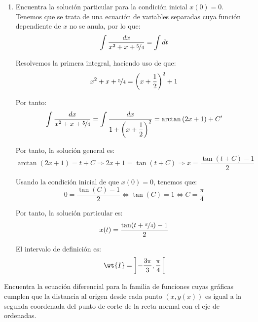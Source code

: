 \documentclass[12pt]{article}
\begin{document}
\begin{ejercicio}
\begin{enumerate}
        \item Encuentra la solución particular para la condición inicial $x(0)=0$.\\
        
        Tenemos que se trata de una ecuación de variables separadas cuya función dependiente de $x$ no se anula, por lo que:
        \begin{equation*}
            \int \dfrac{dx}{x^2+x+\nicefrac{5}{4}}=\int dt
        \end{equation*}

        Resolvemos la primera integral, haciendo uso de que:
        \begin{equation*}
            x^2+x+\nicefrac{5}{4}=\left(x+\dfrac{1}{2}\right)^2+1
        \end{equation*}

        Por tanto:
        \begin{equation*}
            \int \dfrac{dx}{x^2+x+\nicefrac{5}{4}}=\int \dfrac{dx}{1+\left(x+\dfrac{1}{2}\right)^2}=\arctan\left(2x+1\right)+C'
        \end{equation*}

        Por tanto, la solución general es:
        \begin{equation*}
            \arctan\left(2x+1\right)=t+C
            \Longrightarrow 2x+1=\tan(t+C)
            \Longrightarrow x=\dfrac{\tan(t+C)-1}{2}
        \end{equation*}

        Usando la condición inicial de que $x(0)=0$, tenemos que:
        \begin{equation*}
            0=\dfrac{\tan(C)-1}{2}\Longleftrightarrow \tan(C)=1\Longleftrightarrow C=\dfrac{\pi}{4}
        \end{equation*}

        Por tanto, la solución particular es:
        \begin{equation*}
            x(t)=\dfrac{\tan(t+\nicefrac{\pi}{4})-1}{2}
        \end{equation*}

        El intervalo de definición es:
        \begin{equation*}
            \wt{I}=\left]-\dfrac{3\pi}{3},\dfrac{\pi}{4}\right[
        \end{equation*}
    \end{enumerate}
\end{ejercicio}

\begin{ejercicio}
    Encuentra la ecuación diferencial para la familia de funciones cuyas gráficas cumplen que la distancia al origen desde cada punto $(x,y(x))$ es igual a la segunda coordenada del punto de corte de la recta normal con el eje de ordenadas.
\end{ejercicio}
\end{document}
